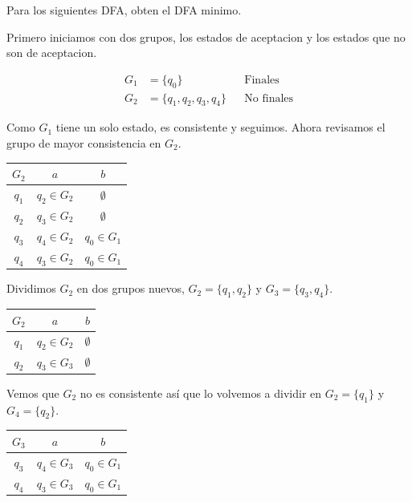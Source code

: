 \newpage
\begin{Pro}
Para los siguientes DFA, obten el DFA minimo. 
\end{Pro}

Primero iniciamos con dos grupos, los estados de aceptacion y los estados que no son de aceptacion.

\begin{center}
\begin{align*}
    G_1 &= \{q_0\} && \text{Finales} \\
    G_2 &= \{q_1, q_2, q_3, q_4\} && \text{No finales}
\end{align*}
\end{center}

Como $G_1$ tiene un solo estado, es consistente y seguimos. 
Ahora revisamos el grupo de mayor consistencia en $G_2$. 


\begin{center}
\begin{tabular} {|c|c|c|}
    \hline
    $G_2$ & $a$ & $b$ \\ 
    \hline
    $q_1$ & $q_2 \in G_2$ & $\emptyset$ \\
    $q_2$ & $q_3 \in G_2$ & $\emptyset$ \\
    $q_3$ & $q_4 \in G_2$ & $q_0 \in G_1$ \\
    $q_4$ & $q_3 \in G_2$ & $q_0 \in G_1$ \\
    \hline
\end{tabular}
\end{center}

Dividimos $G_2$ en dos grupos nuevos, $G_2 = \{q_1, q_2\}$ y $G_3 = \{q_3, q_4\}$.

\begin{center}
\begin{tabular} {|c|c|c|}
    \hline
    $G_2$ & $a$ & $b$ \\ 
    \hline
    $q_1$ & $q_2 \in G_2$ & $\emptyset$ \\
    $q_2$ & $q_3 \in G_3$ & $\emptyset$ \\
    \hline
\end{tabular}
\end{center}

Vemos que $G_2$  no es consistente así que lo volvemos a dividir en $G_2 = \{q_1\}$ y $G_4 = \{q_2\}$.

\begin{center}
\begin{tabular} {|c|c|c|}
    \hline
    $G_3$ & $a$ & $b$ \\ 
    \hline
    $q_3$ & $q_4 \in G_3$ & $q_0 \in G_1$ \\
    $q_4$ & $q_3 \in G_3$ & $q_0 \in G_1$ \\
    \hline
\end{tabular}
\end{center}

